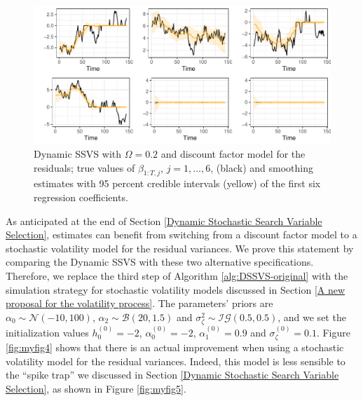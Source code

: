 \documentclass[
  12pt,
]{book}
\theoremstyle{break}
\theoremstyle{nonumberplain}
\begin{document}
\begin{figure}[H]

{\centering \includegraphics{Dynamic-Shrinkage-in-Bayesian-Structural-Time-Series-and-Vector-Autoregressive-Models_files/figure-latex/myfig3-1} 

}

\caption{Dynamic SSVS with $\Omega=0.2$ and discount factor model for the residuals; true values of $\beta_{1:T, j}$, $j=1, \ldots, 6$, (black) and smoothing estimates with 95 percent credible intervals (yellow) of the first six regression coefficients.}\label{fig:myfig3}
\end{figure}

As anticipated at the end of Section
\ref{Dynamic Stochastic Search Variable Selection}, estimates can
benefit from switching from a discount factor model to a stochastic
volatility model for the residual variances. We prove this statement by
comparing the Dynamic SSVS with these two alternative specifications.\\
Therefore, we replace the third step of Algorithm
\ref{alg:DSSVS-original} with the simulation strategy for stochastic
volatility models discussed in Section
\ref{A new proposal for the volatility process}. The parameters' priors
are \(\alpha_0\sim\mathcal{N}(-10,100)\),
\(\alpha_2\sim\mathcal{B}(20,1.5)\) and
\(\sigma^2_{\zeta}\sim\mathcal{IG}(0.5,0.5)\), and we set the
initialization values \(h_0^{(0)}=-2\), \(\alpha_0^{(0)}=-2\),
\(\alpha_1^{(0)}=0.9\) and \(\sigma_{\zeta}^{(0)}=0.1\). Figure
\ref{fig:myfig4} shows that there is an actual improvement when using a
stochastic volatility model for the residual variances. Indeed, this
model is less sensible to the ``spike trap'' we discussed in Section
\ref{Dynamic Stochastic Search Variable Selection}, as shown in Figure
\ref{fig:myfig5}.
\end{document}
